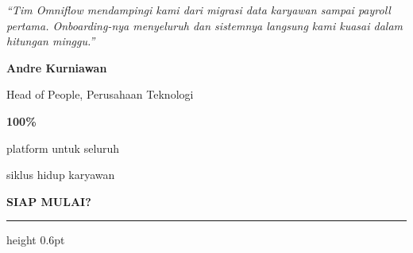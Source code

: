 \documentclass[a4paper]{article}
\newcommand{\sectiontitle}[1]{%
    \vspace{10pt}%
    {\fontsize{13}{16}\selectfont\bfseries\color{BlueDark} #1}\par\vspace{3pt}%
    {\color{BluePrimary}\hrule height 0.6pt}\par\vspace{8pt}%
}
\begin{document}
\noindent
\begin{minipage}[t]{0.485\textwidth}
    \colorbox{BlueBg}{%
        \begin{minipage}{\dimexpr\linewidth-2\fboxsep\relax}
            {\fontsize{9.5}{13}\selectfont\color{TextDark}\textit{``Tim Omniflow mendampingi kami dari migrasi data karyawan sampai payroll pertama. Onboarding-nya menyeluruh dan sistemnya langsung kami kuasai dalam hitungan minggu.''}}\par\vspace{4pt}
            {\fontsize{8.5}{11}\selectfont\bfseries\color{BluePrimary} Andre Kurniawan}\par
            {\fontsize{8}{10}\selectfont\color{TextLight} Head of People, Perusahaan Teknologi}
        \end{minipage}}
\end{minipage}%
\hfill
\begin{minipage}[t]{0.485\textwidth}
    \colorbox{BlueBg}{%
        \begin{minipage}{\dimexpr\linewidth-2\fboxsep\relax}
            \begin{center}
                {\fontsize{20}{24}\selectfont\bfseries\color{BluePrimary} 100\%}\par
                {\fontsize{9.5}{12}\selectfont\color{TextDark} platform untuk seluruh}\par
                {\fontsize{9.5}{12}\selectfont\color{TextDark} siklus hidup karyawan}
            \end{center}
        \end{minipage}}
\end{minipage}

\sectiontitle{SIAP MULAI?}
\end{document}
